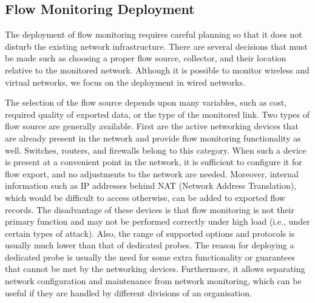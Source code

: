\subsection{Flow Monitoring Deployment}

The deployment of flow monitoring requires careful planning so that it does not disturb the existing network infrastructure. There are several decisions that must be made such as choosing a proper flow source, collector, and their location relative to the monitored network. Although it is possible to monitor wireless and virtual networks, we focus on the deployment in wired networks.

The selection of the flow source depends upon many variables, such as cost, required quality of exported data, or the type of the monitored link. Two types of flow source are generally available. First are the active networking devices that are already present in the network and provide flow monitoring functionality as well. Switches, routers, and firewalls belong to this category. When such a device is present at a convenient point in the network, it is sufficient to configure it for flow export, and no adjustments to the network are needed. Moreover, internal information such as IP addresses behind NAT (Network Address Translation), which would be difficult to access otherwise, can be added to exported flow records. The disadvantage of these devices is that flow monitoring is not their primary function and may not be performed correctly under high load (i.e., under certain types of attack). Also, the range of supported options and protocols is usually much lower than that of dedicated probes. The reason for deploying a dedicated probe is usually the need for some extra functionality or guarantees that cannot be met by the networking devices. Furthermore, it allows separating network configuration and maintenance from network monitoring, which can be useful if they are handled by different divisions of an organisation.

